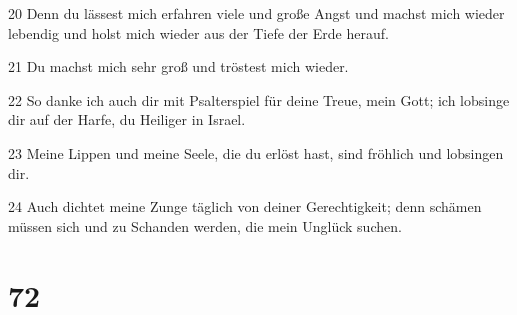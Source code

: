 \par 20 Denn du lässest mich erfahren viele und große Angst und machst mich wieder lebendig und holst mich wieder aus der Tiefe der Erde herauf.
\par 21 Du machst mich sehr groß und tröstest mich wieder.
\par 22 So danke ich auch dir mit Psalterspiel für deine Treue, mein Gott; ich lobsinge dir auf der Harfe, du Heiliger in Israel.
\par 23 Meine Lippen und meine Seele, die du erlöst hast, sind fröhlich und lobsingen dir.
\par 24 Auch dichtet meine Zunge täglich von deiner Gerechtigkeit; denn schämen müssen sich und zu Schanden werden, die mein Unglück suchen.

\chapter{72}

